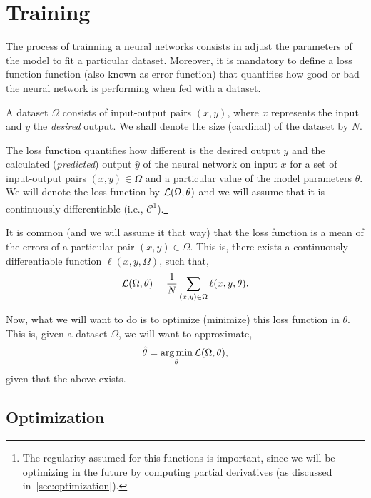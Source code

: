 \section{Training}\label{sec:training}

The process of trainning a neural networks consists in adjust the parameters of
the model to fit a particular dataset. Moreover, it is mandatory to define a
loss function function (also known as error function) that quantifies how good
or bad the neural network is performing when fed with a dataset.

A dataset \(\Omega\) consists of input-output pairs \((x, y)\), where \(x\)
represents the input and \(y\) the \emph{desired} output. We shall denote the
size (cardinal) of the dataset by \(N\).

The loss function quantifies how different is the desired output \(y\) and the
calculated (\emph{predicted}) output \(\hat{y}\) of the neural network on input
\(x\) for a set of input-output pairs \((x , y) \in \Omega\) and a particular
value of the model parameters \(\theta\). We will denote the loss function by
\(\mathcal{L} (\Omega, \theta)\) and we will assume that it is continuously
differentiable (i.e., \(\mathcal{C}^1\)).\footnote{The regularity assumed for
  this functions is important, since we will be optimizing in the future by
  computing partial derivatives (as discussed in\ \vref{sec:optimization}).}

It is common (and we will assume it that way) that the loss function is a mean
of the errors of a particular pair \((x, y) \in \Omega\). This is, there exists
a continuously differentiable function \(\ell (x, y, \Omega)\), such that,
\begin{equation} \label{eq:loss}
  \mathcal{L}(\Omega, \theta) =
  \frac{1}{N} \sum_{(x, y) \in \Omega} \ell (x, y, \theta).
\end{equation}

Now, what we will want to do is to optimize (minimize) this loss function in
\(\theta\). This is, given a dataset \(\Omega\), we will want to approximate,
\begin{equation}
  \hat{\theta} = \operatorname*{arg\,min}_{\theta} \mathcal{L}(\Omega, \theta),
\end{equation}
given that the above exists.


\subsection{Optimization}\label{sec:optimization}

